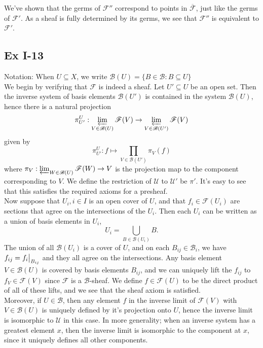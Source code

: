 \documentclass{article}
\newcommand\restr[2]{{%
  \left.\kern-\nulldelimiterspace %
  #1 %
  \vphantom{\big|} %
  \right|_{#2} %
  }}
\theoremstyle{definition}
\begin{document}
We've shown that the germs of $\mathscr{F}''$ correspond to points in
$\overline{\mathscr{F}}$, just like the germs of $\mathscr{F}'$. As a sheaf is
fully determined by its germs, we see that $\mathscr{F}''$ is equivalent to
$\mathscr{F}'$.

\subsection*{Ex I-13}

Notation: When $U \subseteq X$, we write  $\mathscr{B}(U) = \{B \in
\mathscr{B} : B \subseteq U\}$ \\

We begin by verifying that $\mathscr{F}$ is indeed a sheaf. Let $U' \subseteq
U$ be an open set. Then the inverse system of basis elements $\mathscr{B}(U')$
is contained in the system $\mathscr{B}(U)$, hence there is a natural
projection 
\[
	\pi^{U}_{U'}
	:
	\varprojlim_{V \in \mathscr{B}(U)} \mathscr{F}(V)
	\to
	\varprojlim_{V \in \mathscr{B}(U')} \mathscr{F}(V)
\] 
given by
\[
	\pi^{U}_{U'}
	:
	f
	\mapsto
	\prod_{V \in \mathscr{B}(U')}
	\pi_{V}(f)
\]
where $\pi_V : \varprojlim_{W \in \mathscr{B}(U)} \mathscr{F}(W)
\to V$ is the projection map to the component corresponding to $V$. We define
the restriction of $\mathscr{U}$ to $\mathscr{U'}$ be $\pi'$. It's easy to see
that this satisfies the required axioms for a presheaf. \\

Now suppose that $U_i, i \in I$ is an open cover of $U$, and that $f_i \in
\mathscr{F}(U_i)$ are sections that agree on the intersections of the $U_i$.
Then each $U_i$ can be written as a union of basis elements in $U_i$,
\[
	U_i = \bigcup_{B \in \mathscr{B}(U_i)} B.
\] 
The union of all $\mathscr{B}(U_i)$ is a cover of $U$, and on each $B_{ij} \in
\mathscr{B}_i$, we have $f_{ij} = \restr{f_i}{B_{ij}}$ and they all agree on
the intersections. Any basis element $V \in \mathscr{B}(U)$ is covered by basis
elements $B_{ij}$, and we can uniquely lift the $f_{ij}$ to $f_V \in
\mathscr{F}(V)$ since $\mathscr{F}$ is a $\mathscr{B}$-sheaf. We define $f \in
\mathscr{F}(U)$ to be the direct product of all of these lifts, and we see that
the sheaf axiom is satisfied. \\

Moreover, if $U \in \mathscr{B}$, then any element $f$ in the inverse limit of
$\mathscr{F}(V)$ with $V \in \mathscr{B}(U)$ is uniquely defined by it's
projection onto $U$, hence the inverse limit is isomorphic to $\mathscr{U}$ in
this case. In more generality; when an inverse system has a greatest element
$x$, then the inverse limit is isomorphic to the component at $x$, since it
uniquely defines all other components. \\
\end{document}
